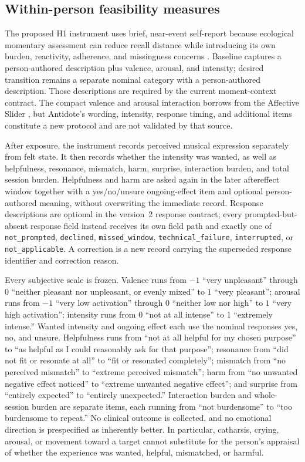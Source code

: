 \subsection{Within-person feasibility measures}
\label{sec:methods-within-person-measures}

The proposed H1 instrument uses brief, near-event self-report because ecological
momentary assessment can reduce recall distance while introducing its own
burden, reactivity, adherence, and missingness concerns
\cite{shiffman2008ema}. Baseline captures a person-authored description plus
valence, arousal, and intensity; desired transition remains a separate nominal
category with a person-authored description. Those descriptions are required
by the current moment-context contract. The compact valence and arousal
interaction borrows from the Affective Slider \cite{betella2016slider}, but
Antidote's wording, intensity, response timing, and additional items constitute
a new protocol and are not validated by that source.

After exposure, the instrument records perceived musical expression separately
from felt state. It then records whether the intensity was wanted, as well as
helpfulness, resonance, mismatch, harm, surprise, interaction burden, and total
session burden. Helpfulness and harm are asked again in the later aftereffect
window together with a yes/no/unsure ongoing-effect item and optional
person-authored meaning, without overwriting the immediate record. Response
descriptions are optional in the version~2 response contract; every
prompted-but-absent response field instead receives its own field path and exactly one
of \texttt{not\_prompted}, \texttt{declined}, \texttt{missed\_window},
\texttt{technical\_failure}, \texttt{interrupted}, or
\texttt{not\_applicable}. A correction is a new record carrying the superseded
response identifier and correction reason.

Every subjective scale is frozen. Valence runs from $-1$ ``very unpleasant''
through 0 ``neither pleasant nor unpleasant, or evenly mixed'' to $1$ ``very pleasant''; arousal runs
from $-1$ ``very low activation'' through 0 ``neither low nor high'' to $1$
``very high activation''; intensity runs from 0 ``not at all intense'' to 1
``extremely intense.'' Wanted intensity and
ongoing effect each use the nominal responses yes, no, and unsure. Helpfulness
runs from ``not at all helpful for my chosen purpose'' to ``as helpful as I
could reasonably ask for that purpose''; resonance from ``did not fit or
resonate at all'' to ``fit or resonated completely''; mismatch from ``no
perceived mismatch'' to ``extreme perceived mismatch''; harm from ``no unwanted
negative effect noticed'' to ``extreme unwanted negative effect''; and surprise
from ``entirely expected'' to ``entirely unexpected.'' Interaction burden and
whole-session burden are separate items, each running from ``not burdensome''
to ``too burdensome to repeat.'' No clinical outcome is collected, and no
emotional direction is prespecified as inherently better. In particular,
catharsis, crying, arousal, or movement toward a target cannot substitute for
the person's appraisal of whether the experience was wanted, helpful,
mismatched, or harmful.

